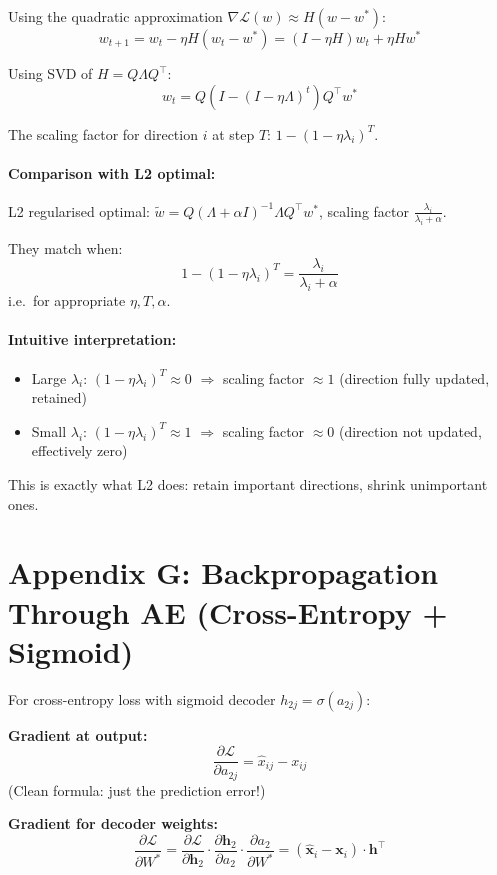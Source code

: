 \documentclass[12pt,a4paper]{article}
\newcommand{\grad}{\nabla}
\newcommand{\vx}{\mathbf{x}}
\newcommand{\vh}{\mathbf{h}}
\newcommand{\hatx}{\hat{\mathbf{x}}}
\newcommand{\Loss}{\mathcal{L}}
\begin{document}
Using the quadratic approximation $\grad\Loss(w) \approx H(w-w^*)$:
\[
  w_{t+1} = w_t - \eta H(w_t - w^*) = (I-\eta H)w_t + \eta Hw^*
\]

Using SVD of $H = Q\Lambda Q^\top$:
\[
  w_t = Q(I-(I-\eta\Lambda)^t)Q^\top w^*
\]

The scaling factor for direction $i$ at step $T$: $1 - (1-\eta\lambda_i)^T$.

\paragraph{Comparison with L2 optimal:}
L2 regularised optimal: $\tilde{w} = Q(\Lambda+\alpha I)^{-1}\Lambda Q^\top w^*$, scaling factor $\frac{\lambda_i}{\lambda_i+\alpha}$.

They match when:
\[
  1 - (1-\eta\lambda_i)^T = \frac{\lambda_i}{\lambda_i+\alpha}
\]
i.e.\ for appropriate $\eta, T, \alpha$.

\paragraph{Intuitive interpretation:}
\begin{itemize}
  \item Large $\lambda_i$: $(1-\eta\lambda_i)^T \approx 0$ $\Rightarrow$ scaling factor $\approx 1$ (direction fully updated, retained)
  \item Small $\lambda_i$: $(1-\eta\lambda_i)^T \approx 1$ $\Rightarrow$ scaling factor $\approx 0$ (direction not updated, effectively zero)
\end{itemize}

This is exactly what L2 does: retain important directions, shrink unimportant ones.

\section{Appendix G: Backpropagation Through AE (Cross-Entropy + Sigmoid)}

For cross-entropy loss with sigmoid decoder $h_{2j} = \sigma(a_{2j})$:

\textbf{Gradient at output:}
\[
  \frac{\partial\Loss}{\partial a_{2j}}
  = \hat{x}_{ij} - x_{ij}
\]
(Clean formula: just the prediction error!)

\textbf{Gradient for decoder weights:}
\[
  \frac{\partial\Loss}{\partial W^*}
  = \frac{\partial\Loss}{\partial\vh_2}\cdot\frac{\partial\vh_2}{\partial a_2}\cdot\frac{\partial a_2}{\partial W^*}
  = (\hatx_i - \vx_i)\cdot\vh^\top
\]
\end{document}
